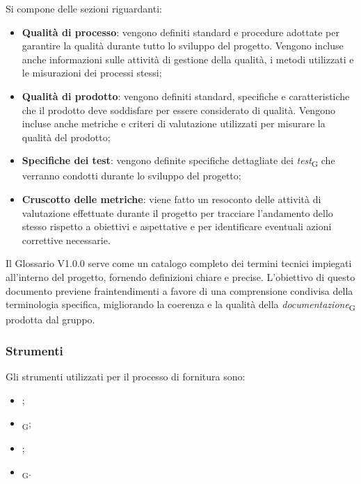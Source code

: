Si compone delle sezioni riguardanti:
\begin{itemize}
    \item \textbf{Qualità di processo}: vengono definiti standard e procedure adottate per garantire la qualità durante tutto lo sviluppo del progetto. Vengono incluse anche informazioni sulle attività di gestione della qualità, i metodi utilizzati e le misurazioni dei processi stessi;
    \item \textbf{Qualità di prodotto}: vengono definiti standard, specifiche e caratteristiche che il prodotto deve soddisfare per essere considerato di qualità. Vengono incluse anche metriche e criteri di valutazione utilizzati per misurare la qualità del prodotto;
    \item \textbf{Specifiche dei test}: vengono definite specifiche dettagliate dei \textit{test}\textsubscript{G} che verranno condotti durante lo sviluppo del progetto;
    \item \textbf{Cruscotto delle metriche}: viene fatto un resoconto delle attività di valutazione effettuate durante il progetto per tracciare l'andamento dello stesso rispetto a obiettivi e aspettative e per identificare eventuali azioni correttive necessarie.
\end{itemize}

Il Glossario V1.0.0 serve come un catalogo completo dei termini tecnici impiegati all'interno del progetto, fornendo definizioni chiare e precise. L'obiettivo di questo documento previene fraintendimenti a favore di una comprensione condivisa della terminologia specifica, migliorando la coerenza e la qualità della \textit{documentazione}\textsubscript{G} prodotta dal gruppo.

\subsubsection{Strumenti}
Gli strumenti utilizzati per il processo di fornitura sono:
\begin{itemize}
    \item {};
    \item \textit{}\textsubscript{G};
    \item {};
    \item \textit{}\textsubscript{G}.
\end{itemize}